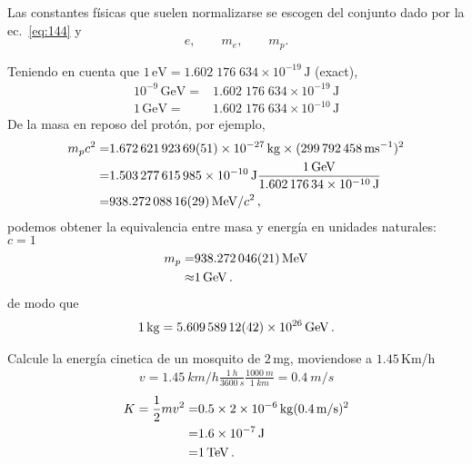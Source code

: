 Las constantes físicas que suelen normalizarse se escogen del conjunto dado por la ec.~\eqref{eq:144} y
\begin{equation}
  \label{eq:145}
  e,\qquad m_e,\qquad m_p.
\end{equation}
\begin{frame}
Teniendo en cuenta que $1\,\text{eV}=1.602\;176\;634\times10^{-19}\,\text{J}$ (exact), 
\begin{align}
  10^{-9}\,\text{GeV}=&1.602\;176\;634\times10^{-19}\,\text{J}\nonumber\\
  1\,\text{GeV}=&1.602\;176\;634\times10^{-10}\,\text{J}
\end{align}
De la masa en reposo del protón, por ejemplo, 
\begin{align*}
  m_pc^2=&\SI{1.67262192369 +- 0.00000000051E-27}{kg}\times (\SI{299792458}{ms^{-1}})^2\nonumber\\
  =&\SI{1.503277615985e-10}{J}\frac{\SI{1}{GeV}}{\SI{1.60217634E-10}{J}}\nonumber\\
  =&\SI{938.27208816+-0.00000029}{MeV}/c^2\,,
\end{align*}
podemos obtener la equivalencia entre masa y energía en unidades naturales: $c=1$
\begin{align}
m_p=&\SI{938.272046+-0.000021}{MeV}\nonumber\\
  \approx& \SI{1}{GeV}\,.
\end{align}
de modo que
\begin{align}
  \SI{1}{kg}=\SI{5.60958912 +- 0.00000042E26}{GeV}\,.
\end{align}

\begin{example}
  Calcule la energía cinetica de un mosquito de $2\,$mg, moviendose a $1.45\,$Km/h
  \begin{align}
    v= \SI{1.45}{km/h}\frac{\SI{1}{h}}{\SI{3600}{s}}\frac{\SI{1000}{m}}{\SI{1}{km}}=\SI{0.4}{m/s}  
\end{align}
\begin{align}
  K=\frac{1}{2}mv^2=&0.5\times \SI{2E-6}{kg}(\SI{0.4}{m/s})^2 \nonumber\\
                   =&\SI{1.6E-7}{J}\nonumber\\
                   =&\SI{1}{TeV}\,.
\end{align}

\end{example}


\end{frame}
